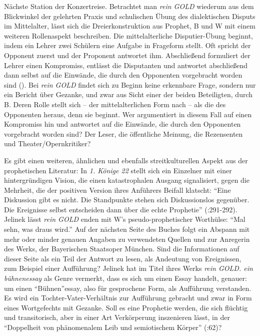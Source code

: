 \documentclass[fontsize=12pt]{scrartcl}
\begin{document}
N\"achste Station der Konzertreise. Betrachtet man \textit{rein GOLD} wiederum aus dem Blickwinkel der gelehrten Praxis und schulischen \"Ubung des dialektischen Disputs im Mittelalter, l\"asst sich die Dreierkonstruktion aus Prophet\textsuperscript{\tiny *}, B und W mit einem weiteren Rollenaspekt beschrei\-ben. Die mittelalterliche Disputier-\"Ubung beginnt, indem ein Lehrer\textsuperscript{\tiny *} zwei Sch\"ulern\textsuperscript{\tiny *} eine Aufgabe in Frageform stellt. Oft spricht der Opponent\textsuperscript{\tiny *} zuerst und der Proponent\textsuperscript{\tiny *} antwortet ihm. Abschlie{\ss}end formuliert der Lehrer\textsuperscript{\tiny *} einen Kompromiss, entl\"asst die Disputanten\textsuperscript{\tiny *} und antwortet abschlie{\ss}end dann \mbox{selbst} auf die Einw\"ande, die durch den Opponenten\textsuperscript{\tiny *} vorgebracht worden sind (\cite{Perigot2014}). Bei \textit{rein GOLD} findet sich zu Beginn keine erkennbare Frage, sondern nur ein Bericht \"uber Gezanke, und zwar aus Sicht einer der beiden Beteiligten, durch B. Deren Rolle stellt sich -- der mittelalterlichen Form nach -- als die des Opponenten\textsuperscript{\tiny *} he\-raus, denn sie beginnt. Wer argumentiert in diesem Fall auf einen Kompromiss hin und antwortet auf die Einw\"ande, die durch den Opponenten\textsuperscript{\tiny *} vorgebracht worden sind? Der Leser\textsuperscript{\tiny *}, die \"of\-fent\-liche Meinung, die Rezensenten\textsuperscript{\tiny *} und Theater/Opern\-kri\-ti\-ker\textsuperscript{\tiny *}?

Es gibt einen weiteren, \"ahnlichen und ebenfalls streitkulturellen Aspekt aus der prophetischen Li\-te\-ra\-tur: In \textit{1. K\"onige 22} stellt sich ein Einzelner mit einer hintergr\"undigen Vision, die einen katastrophalen Ausgang sig\-na\-li\-siert, gegen die Mehrheit, die der positiven Version ihres Anf\"uhrers Beifall klatscht: "`Eine Dis\-kus\-si\-on gibt es nicht. Die Standpunkte stehen sich Dis\-kus\-si\-onslos gegen\"uber. Die Ereignisse \mbox{selbst} entscheiden dann \"uber die echte Prophetie"' (\cite{SeyboldUngern-Sternberg2011}:291-292). Jelinek l\"asst \textit{rein GOLD} enden mit W's pseudo-prophetischer Worth\"ulse: "`Mal sehn, was draus wird."' Auf der n\"achsten Seite des Buches folgt ein Abspann mit mehr oder minder genauen Angaben zu verwendeten Quellen und zur Anregerin des Werks, der Bayerischen Staatsoper M\"unchen. Sind die Informationen auf dieser Seite als ein Teil der Antwort zu lesen, als Andeutung von Ereignissen, zum Beispiel einer Auff\"uh\-rung? Jelinek hat im Titel ihres Werks \textit{rein GOLD. ein b\"uhnenessay} als Genre vermerkt, dass es sich um einen Essay handelt, genauer: um einen "`B\"uhnen"'essay, also f\"ur gesprochene Form, als Auff\"uh\-rung verstanden. Es wird ein Tochter-Vater-Verh\"altnis zur Auff\"uh\-rung gebracht und zwar in Form eines Wortgefechts mit Ge\-zan\-ke. Soll es eine Prophetie werden, die sich fl\"uchtig und transitorisch, aber in einer Art Verk\"orperung inszenieren l\"asst, in der "`Doppelheit von ph\"anomenalem Leib und se\-mio\-tischem K\"orper"' (\cite{Fischer-Lichte2012}:62)?
\end{document}
